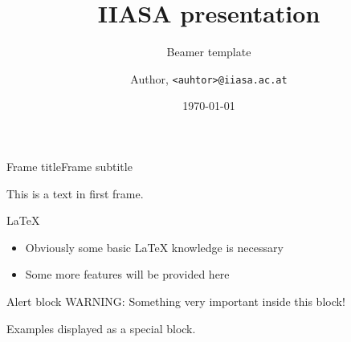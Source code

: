 

\title{IIASA presentation}
\subtitle{Beamer template}
\author{Author, \texttt{<auhtor>@iiasa.ac.at}}
\date{\today}



\begin{frame}
\titlepage
\end{frame}

\begin{frame}{Frame title}{Frame subtitle}

This is a text in first frame. 

  \begin{block}{LaTeX}
  \begin{itemize}
    \item Obviously some basic LaTeX knowledge is necessary
    \item Some more features will be provided here
  \end{itemize}
  \end{block}
  
  \begin{alertblock}{Alert block}
    WARNING: Something very important inside this block!
  \end{alertblock}
  
  \begin{example}
    Examples displayed as a special block.
  \end{example}
  
\end{frame}



